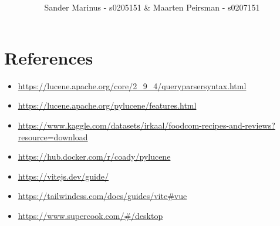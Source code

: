 \documentclass{article}
\title{\textbf{\documentTitle}}
\author{Sander Marinus - s0205151 \& Maarten Peirsman - s0207151}
\begin{document}
\maketitle

\section{References}
\begin{itemize}
    \item \url{https://lucene.apache.org/core/2_9_4/queryparsersyntax.html}
    \item \url{https://lucene.apache.org/pylucene/features.html}
    \item \url{https://www.kaggle.com/datasets/irkaal/foodcom-recipes-and-reviews?resource=download}
    \item \url{https://hub.docker.com/r/coady/pylucene}
    \item \url{https://vitejs.dev/guide/}
    \item \url{https://tailwindcss.com/docs/guides/vite#vue}
    \item \url{https://www.supercook.com/#/desktop}
\end{itemize}
\end{document}
